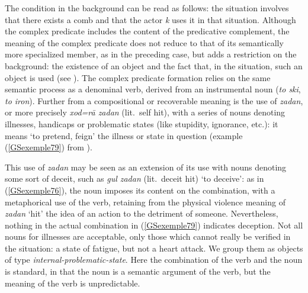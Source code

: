 \noindent
The condition in the background can be read as follows: the situation  involves that there
exists a comb and that the actor \emph{k} uses it in that situation. Although the complex predicate
includes the content of the predicative complement, the meaning of the complex predicate does not
reduce to that of its semantically more specialized member, as in the preceding case, but adds a
restriction on the background: the existence of an object and the fact that, in the situation, such
an object is used (see \citealt[10]{bonami2010persian}). The complex predicate formation relies on the same semantic
  process as a denominal verb, derived from an instrumental noun (\emph{to ski}, \emph{to iron}).
Further from a compositional or recoverable meaning is the use of \emph{zadan}, or more precisely
\emph{xod=r\=a zadan} (lit.\ self hit), with a series of nouns denoting illnesses, handicaps or
problematic states (like stupidity, ignorance, etc.): it means `to pretend, feign' the illness or
state in question (example (\ref{GSexemple79}) from \citealt[223]{pollet2012grammaire}).

\z

\noindent
This use of \emph{zadan} may be seen as an extension of its use with nouns denoting some sort of
deceit, such as \emph{gul zadan} (lit.\ deceit hit) `to deceive’: as in (\ref{GSexemple76}), the
noun imposes its content on the combination, with a metaphorical use of the verb, retaining from the
physical violence meaning of \emph{zadan} `hit’ the idea of an action to the detriment of
someone. Nevertheless, nothing in the actual combination in (\ref{GSexemple79}) indicates
deception. Not all nouns for illnesses are acceptable, only those which cannot really be verified in
the situation: a state of fatigue, but not a heart attack. We group them as objects of type \emph{internal-problematic-state}. Here the combination of the verb and the noun is standard, in that the noun is a semantic argument of the verb, but the meaning of the verb is unpredictable.

\ea
\label{GSexemple80}%
\z

